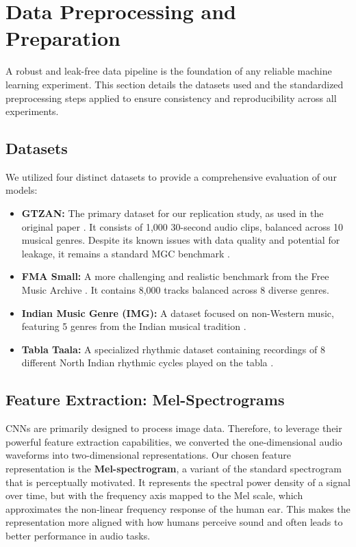 \documentclass[11pt,a4paper]{article}
\begin{document}
\section{Data Preprocessing and Preparation}
\label{sec:data_preprocessing}

A robust and leak-free data pipeline is the foundation of any reliable machine learning experiment. This section details the datasets used and the standardized preprocessing steps applied to ensure consistency and reproducibility across all experiments.

\subsection{Datasets}
We utilized four distinct datasets to provide a comprehensive evaluation of our models:
\begin{itemize}
    \item \textbf{GTZAN:} The primary dataset for our replication study, as used in the original paper \cite{patil}. It consists of 1,000 30-second audio clips, balanced across 10 musical genres. Despite its known issues with data quality and potential for leakage, it remains a standard MGC benchmark \textbf{\cite{tzanetakis2002gtzan}}. %
    \item \textbf{FMA Small:} A more challenging and realistic benchmark from the Free Music Archive \textbf{\cite{defferrard2017fma}}. %
    It contains 8,000 tracks balanced across 8 diverse genres.
    \item \textbf{Indian Music Genre (IMG):} A dataset focused on non-Western music, featuring 5 genres from the Indian musical tradition \textbf{\cite{kaggleIndianMusic}}. %
    \item \textbf{Tabla Taala:} A specialized rhythmic dataset containing recordings of 8 different North Indian rhythmic cycles played on the tabla \textbf{\cite{kaggleTablaTaala}}. %
\end{itemize}

\subsection{Feature Extraction: Mel-Spectrograms}
CNNs are primarily designed to process image data. Therefore, to leverage their powerful feature extraction capabilities, we converted the one-dimensional audio waveforms into two-dimensional representations. Our chosen feature representation is the \textbf{Mel-spectrogram}, a variant of the standard spectrogram that is perceptually motivated. It represents the spectral power density of a signal over time, but with the frequency axis mapped to the Mel scale, which approximates the non-linear frequency response of the human ear. This makes the representation more aligned with how humans perceive sound and often leads to better performance in audio tasks.
\end{document}
